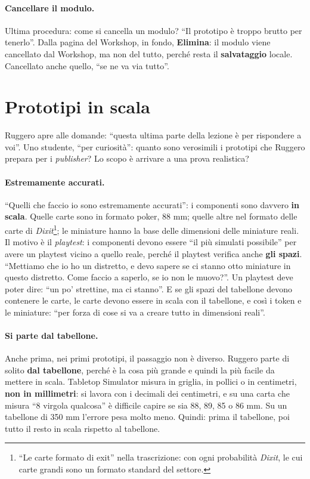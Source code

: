 \paragraph{Cancellare il modulo.} Ultima procedura: come si cancella un modulo? ``Il
prototipo è troppo brutto per tenerlo''. Dalla pagina del Workshop, in fondo,
\textbf{Elimina}: il modulo viene cancellato dal Workshop, ma non del tutto, perché
resta il \textbf{salvataggio} locale. Cancellato anche quello, ``se ne va via tutto''.

\section{Prototipi in scala}
\label{a8:sec:scala}

Ruggero apre alle domande: ``questa ultima parte della lezione è per rispondere a voi''.
Uno studente, ``per curiosità'': quanto sono verosimili i prototipi che Ruggero
prepara per i \emph{publisher}? Lo scopo è arrivare a una prova realistica?

\paragraph{Estremamente accurati.} ``Quelli che faccio io sono estremamente
accurati'': i componenti sono davvero \textbf{in scala}. Quelle carte sono in formato
poker, 88 mm; quelle altre nel formato delle carte di \emph{Dixit}\footnote{``Le carte
formato di exit'' nella trascrizione: con ogni probabilità \emph{Dixit}, le cui carte
grandi sono un formato standard del settore.}; le miniature hanno la base delle
dimensioni delle miniature reali. Il motivo è il \emph{playtest}: i componenti devono
essere ``il più simulati possibile'' per avere un playtest vicino a quello reale,
perché il playtest verifica anche \textbf{gli spazi}. ``Mettiamo che io ho un distretto,
e devo sapere se ci stanno otto miniature in questo distretto. Come faccio a saperlo,
se io non le muovo?''. Un playtest deve poter dire: ``un po' strettine, ma ci stanno''.
E se gli spazi del tabellone devono contenere le carte, le carte devono essere in scala
con il tabellone, e così i token e le miniature: ``per forza di cose si va a creare
tutto in dimensioni reali''.

\paragraph{Si parte dal tabellone.} Anche prima, nei primi prototipi, il passaggio non
è diverso. Ruggero parte di solito \textbf{dal tabellone}, perché è la cosa più grande
e quindi la più facile da mettere in scala. Tabletop Simulator misura in griglia, in
pollici o in centimetri, \textbf{non in millimetri}: si lavora con i decimali dei
centimetri, e su una carta che misura ``8 virgola qualcosa'' è difficile capire se sia
88, 89, 85 o 86 mm. Su un tabellone di 350 mm l'errore pesa molto meno. Quindi: prima
il tabellone, poi tutto il resto in scala rispetto al tabellone.

